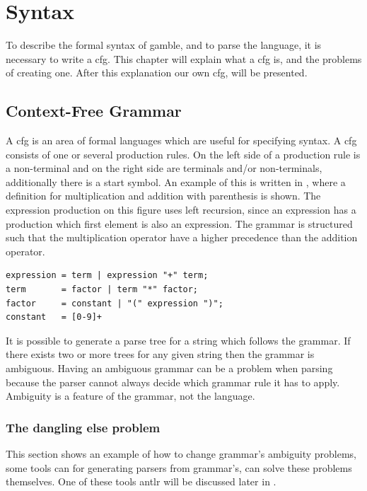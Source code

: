 \chapter{Syntax}\label{chap:syntax}

To describe the formal syntax of \gls{gamble}, and to parse the language, it is necessary to write a \acrfull{cfg}.
This chapter will explain what a \acrshort{cfg} is, and the problems of creating one.
After this explanation our own \acrshort{cfg}, will be presented.

\section{Context-Free Grammar}
A \acrshort{cfg} is an area of formal languages which are useful for specifying syntax. 
A \acrshort{cfg} consists of one or several production rules.
On the left side of a production rule is a non-terminal and on the right side are terminals and/or non-terminals, additionally there is a start symbol.
An example of this is written in , where a definition for multiplication and addition with parenthesis is shown.
The expression production on this figure uses left recursion, since an expression has a production which first element is also an expression.
The grammar is structured such that the multiplication operator have a higher precedence than the addition operator.

\begin{lstlisting}[caption={An example of a \acrshort{cfg} written in \acrshort{ebnf}, with \acrshort{regex} for defining numbers. },frame=tlrb,label={lst:cfglst1},numbers=none]
expression = term | expression "+" term;
term       = factor | term "*" factor;
factor     = constant | "(" expression ")";
constant   = [0-9]+
\end{lstlisting}

It is possible to generate a parse tree for a string which follows the grammar. 
If there exists two or more trees for any given string then the grammar is ambiguous. 
Having an ambiguous grammar can be a problem when parsing because the parser cannot always decide which grammar rule it has to apply.
Ambiguity is a feature of the grammar, not the language. 

\subsection{The dangling else problem}
This section shows an example of how to change grammar's ambiguity problems, some tools can for generating parsers from grammar's, can solve these problems themselves.
One of these tools \acrshort{antlr} will be discussed later in .

